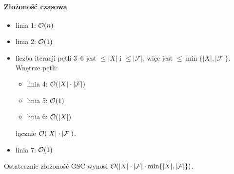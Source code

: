 \paragraph{Złożoność czasowa}
\begin{itemize}[nosep]
	\item linia 1: $\mathcal{O}(n)$
	\item linia 2: $\mathcal{O}(1)$
	\item liczba iteracji pętli 3--6 jest $\leq |X|$ i $\leq |\mathcal{F}|$, więc jest $\leq \min\{|X|, |\mathcal{F}|\}$. Wnętrze pętli:
	      \begin{itemize}[nosep]
		      \item linia 4: $\mathcal{O}(|X| \cdot |\mathcal{F}|)$
		      \item linia 5: $\mathcal{O}(1)$
		      \item linia 6: $\mathcal{O}(|X|)$
	      \end{itemize}
	      łącznie $\mathcal{O}(|X| \cdot |\mathcal{F}|)$.
	\item linia 7: $\mathcal{O}(1)$
\end{itemize}
Ostatecznie złożoność GSC wynosi $\mathcal{O}(|X| \cdot |\mathcal{F}| \cdot \min\{|X|, |\mathcal{F}|\})$.

